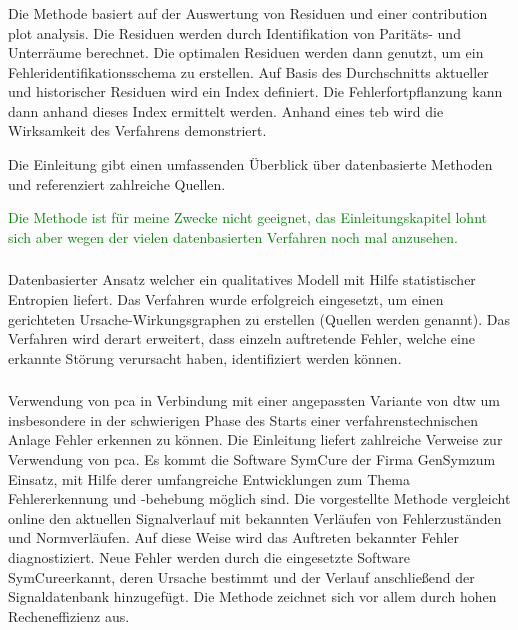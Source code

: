 \subsubsection{\cite{Wang_2016}} Die Methode basiert auf der Auswertung von Residuen und einer \glqq contribution plot analysis\grqq { }. Die Residuen werden durch Identifikation von Parit\"ats- und Unterr\"aume berechnet. Die optimalen Residuen werden dann genutzt, um ein Fehleridentifikationsschema zu erstellen. Auf Basis des Durchschnitts aktueller und historischer Residuen wird ein Index definiert. Die Fehlerfortpflanzung kann dann anhand dieses Index ermittelt werden. Anhand eines \ac{teb} wird die Wirksamkeit des Verfahrens demonstriert.

Die Einleitung gibt einen umfassenden \"Uberblick \"uber datenbasierte Methoden und referenziert zahlreiche Quellen.  

\textcolor{green}{Die Methode ist f\"ur meine Zwecke nicht geeignet, das Einleitungskapitel lohnt sich aber wegen der vielen datenbasierten Verfahren noch mal anzusehen.}

\subsubsection{\cite{Hajihosseini2014}} Datenbasierter Ansatz welcher ein qualitatives Modell mit Hilfe statistischer Entropien liefert.  Das Verfahren wurde erfolgreich eingesetzt, um einen gerichteten Ursache-Wirkungsgraphen zu erstellen (Quellen werden genannt). Das Verfahren wird derart erweitert, dass einzeln auftretende Fehler, welche eine erkannte St\"orung verursacht haben, identifiziert werden k\"onnen.

\subsubsection{\cite{Wang2012}} Verwendung von \ac{pca} in Verbindung mit einer angepassten Variante von \ac{dtw} um insbesondere in der schwierigen Phase des Starts einer verfahrenstechnischen Anlage Fehler erkennen zu k\"onnen. Die Einleitung liefert zahlreiche Verweise zur Verwendung von \ac{pca}. Es kommt die Software \glqq SymCure\grqq { } der Firma \glqq GenSym\grqq { }zum Einsatz, mit Hilfe derer umfangreiche Entwicklungen zum Thema Fehlererkennung und -behebung m\"oglich sind. Die vorgestellte Methode vergleicht online den aktuellen Signalverlauf mit bekannten Verl\"aufen von Fehlerzust\"anden und Normverl\"aufen. Auf diese Weise wird das Auftreten bekannter Fehler diagnostiziert. Neue Fehler werden durch die eingesetzte Software \glqq SymCure\grqq { }erkannt, deren Ursache bestimmt und der Verlauf anschlie\ss{}end der Signaldatenbank hinzugef\"ugt. Die Methode zeichnet sich vor allem durch hohen Recheneffizienz aus.

